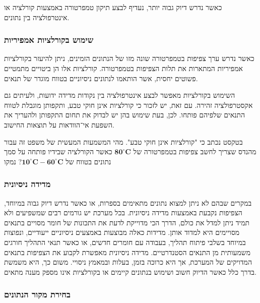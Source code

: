 \documentclass[
  hebrew,
  letterpaper,
  DIV=11,
  numbers=noendperiod]{scrreprt}
\begin{document}
כאשר נדרש דיוק גבוה יותר, נעדיף לבצע תיקון טמפרטורה באמצעות קורלציה או
אינטרפולציה בין נתונים.

\subsubsection{שימוש בקורלציות
אמפיריות}\label{ux5e9ux5d9ux5deux5d5ux5e9-ux5d1ux5e7ux5d5ux5e8ux5dcux5e6ux5d9ux5d5ux5ea-ux5d0ux5deux5e4ux5d9ux5e8ux5d9ux5d5ux5ea}

כאשר נדרש ערך צפיפות בטמפרטורה שונה מזו של הנתונים הזמינים, ניתן להיעזר
בקורלציות אמפיריות המתארות את תלות הצפיפות בטמפרטורה. קורלציות אלו הן
ביטויים מתמטיים פשוטים יחסית, אשר הותאמו לנתונים ניסיוניים בטווח מוגדר
של תנאים.

השימוש בקורלציות מאפשר לבצע אינטרפולציה בין נקודות מדידה ידועות, ולעיתים
גם אקסטרפולציה זהירה. עם זאת, יש לזכור כי קורלציות אינן חוקי טבע,
ותקפותן מוגבלת לטווח התנאים שלפיהם פותחו. לכן, בעת שימוש בהן יש לבדוק את
תחום התקפותן ולהעריך את השפעת אי־הוודאות על תוצאות החישוב.

בטקסט נכתב כי "קורלציות אינן חוקי טבע". מהי המשמעות המעשית של משפט זה
עבור מהנדס שצריך לחשב צפיפות בטמפרטורה של
\(\mathbf{8}\mathbf{0}^{\mathbf{\circ}}\mathbf{C}\) כאשר הקורלציה שבידיו
פותחה על סמך נתונים בטווח של
\(\mathbf{1}\mathbf{0}^{\mathbf{\circ}}\mathbf{C - 6}\mathbf{0}^{\mathbf{\circ}}\mathbf{C}\)?
נמקו

\subsubsection{מדידה
ניסיונית}\label{ux5deux5d3ux5d9ux5d3ux5d4-ux5e0ux5d9ux5e1ux5d9ux5d5ux5e0ux5d9ux5ea}

במקרים שבהם לא ניתן למצוא נתונים מתאימים בספרות, או כאשר נדרש דיוק גבוה
במיוחד, הצפיפות נקבעת באמצעות מדידה ניסיונית. בכל מערכת יש גורמים רבים
שמשפיעים ולא תמיד ניתן למדל את כולם, הדרך הכי מדוייקת לדעת את התכונות של
חומר מסויים בתנאים מסויימים היא למדוד אותן. מדידות כאלה מבוצעות באמצעים
ניסיוניים ייעודיים, ונפוצות במיוחד בשלבי פיתוח תהליך, בעבודה עם חומרים
חדשים, או כאשר תנאי התהליך חורגים משמעותית מן התנאים הסטנדרטיים. מדידה
ניסיונית מאפשרת לקבוע את הצפיפות בתנאים המדויקים של המערכת, אך היא כרוכה
בזמן, בעלות ובמאמץ ניסויי. משום כך, היא משמשת בדרך כלל כאשר הדיוק חשוב
ושימוש בנתונים קיימים או בקורלציות אינו מספק מענה מתאים.

\subsubsection{בחירת מקור
הנתונים}\label{ux5d1ux5d7ux5d9ux5e8ux5ea-ux5deux5e7ux5d5ux5e8-ux5d4ux5e0ux5eaux5d5ux5e0ux5d9ux5dd}
\end{document}
